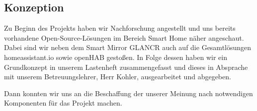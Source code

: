 \subsection{Konzeption}\label{zs_konzeption}
Zu Beginn des Projekts haben wir Nachforschung angestellt und uns bereits vorhandene Open-Source-Lösungen im Bereich Smart Home näher angeschaut.
Dabei sind wir neben dem Smart Mirror GLANCR auch auf die Gesamtlösungen homeassistant.io sowie openHAB gestoßen. 
In Folge dessen haben wir ein Grundkonzept in unserem Lastenheft zusammengefasst und dieses in Absprache mit unserem Betreuungslehrer, Herr Kohler, ausgearbeitet und abgegeben.\par
\noindent Dann konnten wir uns an die Beschaffung der unserer Meinung nach notwendigen Komponenten für das Projekt machen.
